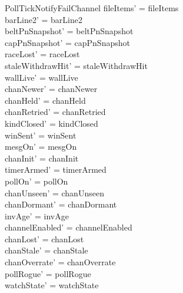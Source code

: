 \documentclass[a4paper,10pt,fleqn]{article}
\begin{document}
\begin{schema}{PollTickNotifyFailChannel}
  fileItems' = fileItems \\
  barLine2' = barLine2 \\
  beltPnSnapshot' = beltPnSnapshot \\
  capPnSnapshot' = capPnSnapshot \\
  raceLost' = raceLost \\
  staleWithdrawHit' = staleWithdrawHit \\
  wallLive' = wallLive \\
  chanNewer' = chanNewer \\
  chanHeld' = chanHeld \\
  chanRetried' = chanRetried \\
  kindClosed' = kindClosed \\
  winSent' = winSent \\
  mesgOn' = mesgOn \\
  chanInit' = chanInit \\
  timerArmed' = timerArmed \\
  pollOn' = pollOn \\
  chanUnseen' = chanUnseen \\
  chanDormant' = chanDormant \\
  invAge' = invAge \\
  channelEnabled' = channelEnabled \\
  chanLost' = chanLost \\
  chanStale' = chanStale \\
  chanOverrate' = chanOverrate \\
  pollRogue' = pollRogue \\
  watchState' = watchState
\end{schema}
\end{document}
